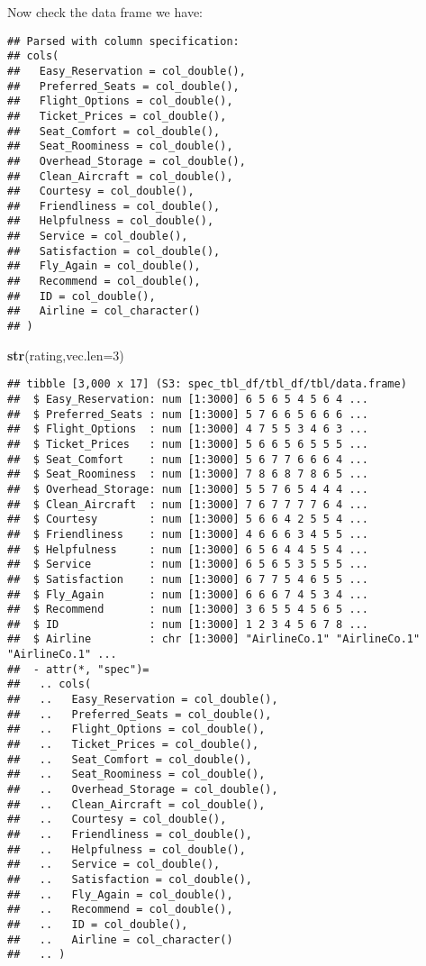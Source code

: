 \documentclass[
]{article}
\newenvironment{Shaded}{\begin{snugshade}}{\end{snugshade}}
\newcommand{\DataTypeTok}[1]{\textcolor[rgb]{0.13,0.29,0.53}{#1}}
\newcommand{\DecValTok}[1]{\textcolor[rgb]{0.00,0.00,0.81}{#1}}
\newcommand{\KeywordTok}[1]{\textcolor[rgb]{0.13,0.29,0.53}{\textbf{#1}}}
\newcommand{\NormalTok}[1]{#1}
\begin{document}
Now check the data frame we have:

\begin{verbatim}
## Parsed with column specification:
## cols(
##   Easy_Reservation = col_double(),
##   Preferred_Seats = col_double(),
##   Flight_Options = col_double(),
##   Ticket_Prices = col_double(),
##   Seat_Comfort = col_double(),
##   Seat_Roominess = col_double(),
##   Overhead_Storage = col_double(),
##   Clean_Aircraft = col_double(),
##   Courtesy = col_double(),
##   Friendliness = col_double(),
##   Helpfulness = col_double(),
##   Service = col_double(),
##   Satisfaction = col_double(),
##   Fly_Again = col_double(),
##   Recommend = col_double(),
##   ID = col_double(),
##   Airline = col_character()
## )
\end{verbatim}

\begin{Shaded}
\begin{Highlighting}[]
\KeywordTok{str}\NormalTok{(rating,}\DataTypeTok{vec.len=}\DecValTok{3}\NormalTok{)}
\end{Highlighting}
\end{Shaded}

\begin{verbatim}
## tibble [3,000 x 17] (S3: spec_tbl_df/tbl_df/tbl/data.frame)
##  $ Easy_Reservation: num [1:3000] 6 5 6 5 4 5 6 4 ...
##  $ Preferred_Seats : num [1:3000] 5 7 6 6 5 6 6 6 ...
##  $ Flight_Options  : num [1:3000] 4 7 5 5 3 4 6 3 ...
##  $ Ticket_Prices   : num [1:3000] 5 6 6 5 6 5 5 5 ...
##  $ Seat_Comfort    : num [1:3000] 5 6 7 7 6 6 6 4 ...
##  $ Seat_Roominess  : num [1:3000] 7 8 6 8 7 8 6 5 ...
##  $ Overhead_Storage: num [1:3000] 5 5 7 6 5 4 4 4 ...
##  $ Clean_Aircraft  : num [1:3000] 7 6 7 7 7 7 6 4 ...
##  $ Courtesy        : num [1:3000] 5 6 6 4 2 5 5 4 ...
##  $ Friendliness    : num [1:3000] 4 6 6 6 3 4 5 5 ...
##  $ Helpfulness     : num [1:3000] 6 5 6 4 4 5 5 4 ...
##  $ Service         : num [1:3000] 6 5 6 5 3 5 5 5 ...
##  $ Satisfaction    : num [1:3000] 6 7 7 5 4 6 5 5 ...
##  $ Fly_Again       : num [1:3000] 6 6 6 7 4 5 3 4 ...
##  $ Recommend       : num [1:3000] 3 6 5 5 4 5 6 5 ...
##  $ ID              : num [1:3000] 1 2 3 4 5 6 7 8 ...
##  $ Airline         : chr [1:3000] "AirlineCo.1" "AirlineCo.1" "AirlineCo.1" ...
##  - attr(*, "spec")=
##   .. cols(
##   ..   Easy_Reservation = col_double(),
##   ..   Preferred_Seats = col_double(),
##   ..   Flight_Options = col_double(),
##   ..   Ticket_Prices = col_double(),
##   ..   Seat_Comfort = col_double(),
##   ..   Seat_Roominess = col_double(),
##   ..   Overhead_Storage = col_double(),
##   ..   Clean_Aircraft = col_double(),
##   ..   Courtesy = col_double(),
##   ..   Friendliness = col_double(),
##   ..   Helpfulness = col_double(),
##   ..   Service = col_double(),
##   ..   Satisfaction = col_double(),
##   ..   Fly_Again = col_double(),
##   ..   Recommend = col_double(),
##   ..   ID = col_double(),
##   ..   Airline = col_character()
##   .. )
\end{verbatim}
\end{document}
